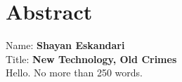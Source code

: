 
\chapter*{Abstract}

Name: 	\tab \textbf{Shayan Eskandari} \\
Title: 	\tab \textbf{New Technology, Old Crimes}\\


Hello. No more than 250 words.





